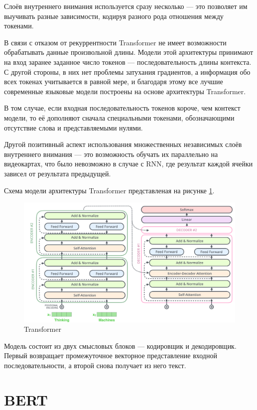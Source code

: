 Слоёв внутреннего внимания используется сразу несколько --- это позволяет им выучивать разные зависимости, кодируя разного рода отношения между токенами.

В связи с отказом от рекуррентности Transformer не имеет возможности обрабатывать данные произвольной длины. Модели этой архитектуры принимают на вход заранее заданное число токенов --- последовательность длины контекста. С другой стороны, в них нет проблемы затухания градиентов, а информация обо всех токенах учитывается в равной мере, и благодаря этому все лучшие современные языковые модели построены на основе архитектуры Transformer.

В том случае, если входная последовательность токенов короче, чем контекст модели, то её дополняют сначала специальными токенами, обозначающими отсутствие слова и представляемыми нулями.

Другой позитивный аспект использования множественных независимых слоёв внутреннего внимания --- это возможность обучать их параллельно на видеокартах, что было невозможно в случае с RNN, где результат каждой ячейки зависел от результата предыдущей.

Схема модели архитектуры Transformer представленая на рисунке \ref*{fig:transformer}.

\begin{figure}[h]
    \centering
    \includegraphics[width=\textwidth]{../inc/images/transformer.png}
    \caption{Transformer}
    \label{fig:transformer}
\end{figure}

Модель состоит из двух смысловых блоков --- кодировщик и декодировщик. Первый возвращает промежуточное векторное представление входной последовательности, а второй снова получает из него текст.

\section{BERT}

